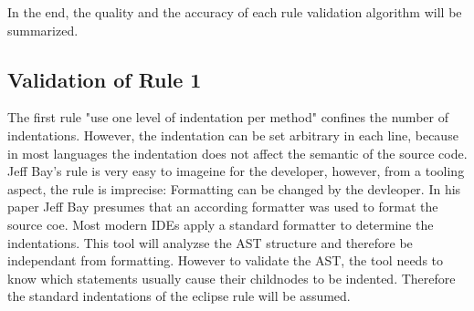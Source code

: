 In the end, the quality and the accuracy of each rule validation algorithm will be summarized. 



  
 
 
 
 
 
  

\subsection*{Validation of Rule 1}
The first rule "use one level of indentation per method" confines the number of indentations. However, the indentation can be set arbitrary in each line, because in most languages the indentation does not affect the semantic of the source code. Jeff Bay's rule is very easy to imageine for the developer, however, from a tooling aspect, the rule is imprecise: Formatting can be changed by the devleoper. In his paper Jeff Bay presumes that an according formatter was used to format the source coe. Most modern \acf{IDE}s apply a standard formatter to determine the indentations. This tool will analyzse the \acf{AST} structure and therefore be independant from formatting. However to validate the \acf{AST}, the tool needs to know which statements usually cause their childnodes to be indented. Therefore the standard indentations of the eclipse rule will be assumed.
\\

